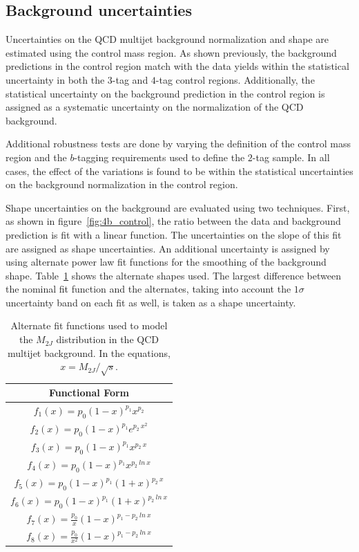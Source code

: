 \subsection{Background uncertainties}

Uncertainties on the QCD multijet background normalization and shape are estimated using the control mass region. As shown previously, the background predictions in the control region match with the data yields within the statistical uncertainty in both the $3$-tag and $4$-tag control regions. Additionally, the statistical uncertainty on the background prediction in the control region is assigned as a systematic uncertainty on the normalization of the QCD background. 

Additional robustness tests are done by varying the definition of the control mass region and the $b$-tagging requirements used to define the $2$-tag sample. In all cases, the effect of the variations is found to be within the statistical uncertainties on the background normalization in the control region. 

Shape uncertainties on the background are evaluated using two techniques. First, as shown in figure~\ref{fig:4b_control}, the ratio between the data and background prediction is fit with a linear function. The uncertainties on the slope of this fit are assigned as shape uncertainties. An additional uncertainty is assigned by using alternate power law fit functions for the smoothing of the background shape. Table~\ref{tab:SystFunctions} shows the alternate shapes used. The largest difference between the nominal fit function and the alternates, taking into account the $1\sigma$ uncertainty band on each fit as well, is taken as a shape uncertainty. 

\begin{table}[htbp!]
\captionsetup{justification=centering}
\begin{center} 
\begin{tabular}{|c|}
\hline
Functional Form \\
\hline
$f_{1}(x) = p_0 (1-x)^{p_1} x^{p_2}$ \\
$f_{2}(x) = p_0 (1-x)^{p_1} e^{p_2\ x^2}$ \\
$f_{3}(x) = p_0 (1-x)^{p_1} x^{p_2\ x}$ \\
$f_{4}(x) = p_0 (1-x)^{p_1} x^{p_2\ ln\ x}$ \\
$f_{5}(x) = p_0 (1-x)^{p_1} (1+x)^{p_2\ x}$ \\
$f_{6}(x) = p_0 (1-x)^{p_1} (1+x)^{p_2\ ln\ x}$ \\
$f_{7}(x) = \frac{p_0}{x} (1-x)^{p_1 - p_2\ ln\ x}$ \\
$f_{8}(x) = \frac{p_0}{x^2} (1-x)^{p_1 - p_2\ ln\ x}$ \\
\hline
\end{tabular}
\caption{Alternate fit functions used to model the $M_{2J}$ distribution in the QCD multijet background. In the equations, $x = M_{2J} / \sqrt{s}$.}
\label{tab:SystFunctions}
\end{center}
\end{table}

